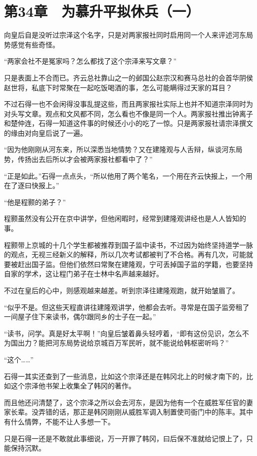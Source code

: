 \section{第34章　为慕升平拟休兵（一）}

向皇后自是没听过宗泽这个名字，只是对两家报社同时启用同一个人来评述河东局势感觉有些奇怪。

“两家会社不是冤家吗？怎么都找了这个宗泽来写文章？”

只是表面上不合而已。齐云总社靠山之一的邺国公赵宗汉和赛马总社的会首华阴侯赵世将，私底下时常聚在一起吃饭喝酒的事，怎么可能瞒得过天家的耳目？

不过石得一也不会闲得没事乱提这些，而且两家报社实际上也并不知道宗泽同时为对头写文章。观点和文风都不同，怎么看也不像是同一个人。两家报社推出钟离子和楚仲连，石得一知道这件事的时候还小小的吃了一惊。只是两家报社请宗泽撰文的缘由对向皇后说了一遍。

“因为他刚刚从河东来，所以深悉当地情势？又在建隆观与人舌辩，纵谈河东局势，传扬出去后所以才会被两家报社都看中了？”

“正是如此。”石得一点点头，“所以他用了两个笔名，一个用在齐云快报上，一个用在了逐曰快报上。”

“他是程颢的弟子？”

程颢虽然没有公开在京中讲学，但他闲暇时，经常到建隆观讲经也是人人皆知的事。

程颢带上京城的十几个学生都被推荐到国子监中读书，不过因为始终坚持道学一脉的观点，无视三经新义的解释，所以几次考试都被判了不合格。再有几次，可能就要被赶出国子监。但他们依然曰常聚在建隆观，宁可丢掉国子监的学籍，也要坚持自家的学术，这让程门弟子在士林中名声越来越好。

不过在皇后的心中，则感观越来越差。听到宗泽往建隆观跑，就开始皱眉了。

“似乎不是。但这些天程直讲往建隆观讲学，他都会去听。寻常是在国子监旁租了一间屋子住下来读书，偶尔跟同乡的士子在一起。”

“读书，问学。真是好太平啊！”向皇后皱着鼻头轻哼着，“即有这份见识，怎么不为国出力？能把河东局势说给京城百万军民听，就不能说给韩枢密听吗？”

“这个……”

石得一其实还查到了一些消息，比如这个宗泽还是在韩冈北上的时候才南下的，比如这个宗泽他书架上收集全了韩冈的著作。

而且他还问清楚了，这个宗泽之所以会去河东，是因为他有一个在威胜军任官的妻家长辈。没弄错的话，那正是韩冈刚刚从威胜军调入制置使司衙门中的陈丰。其中有什么情弊，不能不让人多想一下。

只是石得一还是不敢就此事细说，万一开罪了韩冈，曰后保不准就给记恨上了，只能保持沉默。

